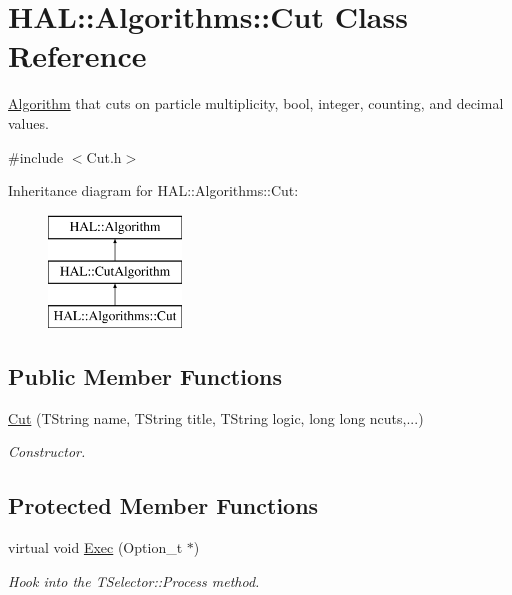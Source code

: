 \hypertarget{class_h_a_l_1_1_algorithms_1_1_cut}{\section{H\+A\+L\+:\+:Algorithms\+:\+:Cut Class Reference}
\label{class_h_a_l_1_1_algorithms_1_1_cut}
}


\hyperlink{class_h_a_l_1_1_algorithm}{Algorithm} that cuts on particle multiplicity, bool, integer, counting, and decimal values.  




{\ttfamily \#include $<$Cut.\+h$>$}

Inheritance diagram for H\+A\+L\+:\+:Algorithms\+:\+:Cut\+:\begin{figure}[H]
\begin{center}
\leavevmode
\includegraphics[height=3.000000cm]{class_h_a_l_1_1_algorithms_1_1_cut}
\end{center}
\end{figure}
\subsection*{Public Member Functions}
\begin{DoxyCompactItemize}
\item 
\hyperlink{class_h_a_l_1_1_algorithms_1_1_cut_a91f1ee2770d1a90d503cd1b6300dbce2}{Cut} (T\+String name, T\+String title, T\+String logic, long long ncuts,...)
\begin{DoxyCompactList}\small\item\em Constructor. \end{DoxyCompactList}\end{DoxyCompactItemize}
\subsection*{Protected Member Functions}
\begin{DoxyCompactItemize}
\item 
virtual void \hyperlink{class_h_a_l_1_1_algorithms_1_1_cut_aa1257616a4912852aa4ce2eb849e2ead}{Exec} (Option\+\_\+t $\ast$)
\begin{DoxyCompactList}\small\item\em Hook into the T\+Selector\+::\+Process method. \end{DoxyCompactList}\end{DoxyCompactItemize}
